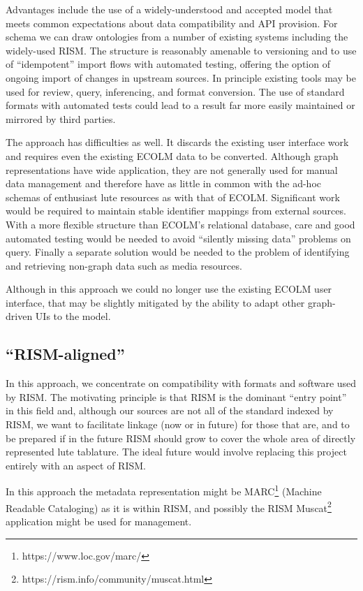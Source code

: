 \documentclass[sigconf]{acmart}
\begin{document}
\begin{sloppypar}
  Advantages include the use of a widely-understood and accepted model
  that meets common expectations about data compatibility and API
  provision. For schema we can draw ontologies from a number of
  existing systems including the widely-used RISM. The structure is
  reasonably amenable to versioning and to use of ``idempotent''
  import flows with automated testing, offering the option of ongoing
  import of changes in upstream sources. In principle existing tools
  may be used for review, query, inferencing, and format
  conversion. The use of standard formats with automated tests could
  lead to a result far more easily maintained or mirrored by third
  parties.

  The approach has difficulties as well. It discards the existing user
  interface work and requires even the existing ECOLM data to be
  converted. Although graph representations have wide application,
  they are not generally used for manual data management and therefore
  have as little in common with the ad-hoc schemas of enthusiast lute
  resources as with that of ECOLM. Significant work would be required
  to maintain stable identifier mappings from external sources. With a
  more flexible structure than ECOLM's relational database, care and
  good automated testing would be needed to avoid ``silently missing
  data'' problems on query. Finally a separate solution would be
  needed to the problem of identifying and retrieving non-graph data
  such as media resources.

  Although in this approach we could no longer use the existing ECOLM
  user interface, that may be slightly mitigated by the ability to
  adapt other graph-driven UIs to the model.
  
  \subsection{``RISM-aligned''}

  In this approach, we concentrate on compatibility with formats and
  software used by RISM. The motivating principle is that RISM is the
  dominant ``entry point'' in this field and, although our sources are
  not all of the standard indexed by RISM, we want to facilitate
  linkage (now or in future) for those that are, and to be prepared if
  in the future RISM should grow to cover the whole area of directly
  represented lute tablature. The ideal future would involve replacing
  this project entirely with an aspect of RISM.

  In this approach the metadata representation might be
  MARC\footnote{https://www.loc.gov/marc/} (Machine Readable
  Cataloging) as it is within RISM, and possibly the RISM
  Muscat\footnote{https://rism.info/community/muscat.html} application
  might be used for management.
  
\end{sloppypar}
\end{document}
